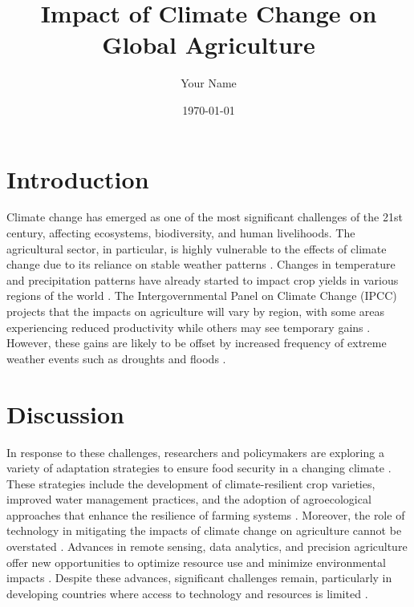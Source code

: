 \documentclass{article}
\begin{document}
\title{Impact of Climate Change on Global Agriculture}
\author{Your Name}
\date{\today}
\maketitle

\section*{Introduction}

Climate change has emerged as one of the most significant challenges of the 21st century, affecting ecosystems, biodiversity, and human livelihoods. The agricultural sector, in particular, is highly vulnerable to the effects of climate change due to its reliance on stable weather patterns \cite{porter2014climate, schlenker2009nonlinear}. Changes in temperature and precipitation patterns have already started to impact crop yields in various regions of the world \cite{lobell2011climate, hatfield2011climate}. The Intergovernmental Panel on Climate Change (IPCC) projects that the impacts on agriculture will vary by region, with some areas experiencing reduced productivity while others may see temporary gains \cite{ipcc2014climate}. However, these gains are likely to be offset by increased frequency of extreme weather events such as droughts and floods \cite{wheeler2013climate, smith2014agriculture}.

\section*{Discussion}

In response to these challenges, researchers and policymakers are exploring a variety of adaptation strategies to ensure food security in a changing climate \cite{howden2007adapting, nelson2009climate}. These strategies include the development of climate-resilient crop varieties, improved water management practices, and the adoption of agroecological approaches that enhance the resilience of farming systems \cite{altieri2009agroecology, vermeulen2012climate}. Moreover, the role of technology in mitigating the impacts of climate change on agriculture cannot be overstated \cite{tilman2011global, searchinger2018world}. Advances in remote sensing, data analytics, and precision agriculture offer new opportunities to optimize resource use and minimize environmental impacts \cite{kamilaris2018using, puma2015assessing}. Despite these advances, significant challenges remain, particularly in developing countries where access to technology and resources is limited \cite{fao2018state, godfray2010food}.

\printbibliography
\end{document}
